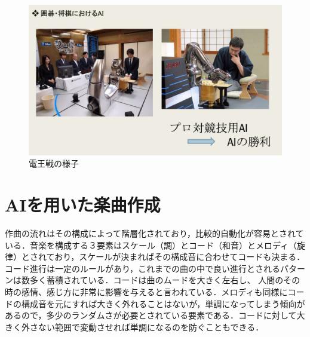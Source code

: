 \newpage
\begin{figure}[!ht]
    \begin{screen}
    \begin{center}
        \includegraphics[scale=0.7, clip]{./img/igo1.png}
        \caption{電王戦の様子}
        \label{fig:電王戦の様子}
    \end{center}
\end{screen}
\end{figure}
\newpage
\section{AIを用いた楽曲作成}
作曲の流れはその構成によって階層化されており，比較的自動化が容易とされている．音楽を構成する３要素はスケール（調）とコード（和音）とメロディ（旋律）とされており，スケールが決まればその構成音に合わせてコードも決まる．コード進行は一定のルールがあり，これまでの曲の中で良い進行とされるパターンは数多く蓄積されている．コードは曲のムードを大きく左右し、
人間のその時の感情、感じ方に非常に影響を与えると言われている．メロディも同様にコードの構成音を元にすれば大きく外れることはないが，単調になってしまう傾向があるので，多少のランダムさが必要とされている要素である．コードに対して大きく外さない範囲で変動させれば単調になるのを防ぐこともできる．

